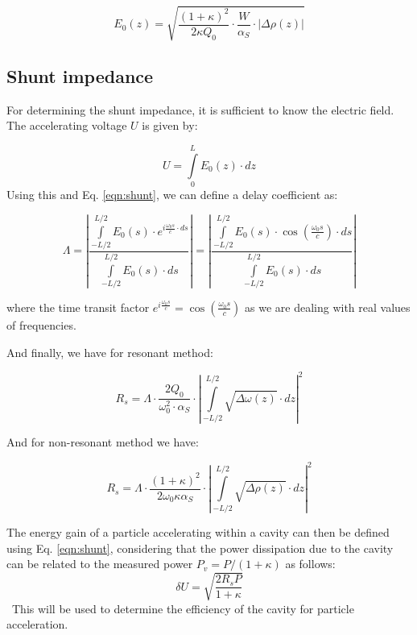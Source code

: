 \documentclass[a4paper]{report}
\numberwithin{equation}{section}
\begin{document}
\begin{equation} \label{eqn:E0_nonres}
		E_{0}(z) = \sqrt{\frac{(1 + \kappa)^2}{2 \kappa Q_{0}}\cdot \frac{W}{\alpha_{S}}\cdot \left| \Delta \rho(z) \right| }
\end{equation}

\subsection{Shunt impedance}
For determining the shunt impedance, it is sufficient to know the electric field. The accelerating voltage $U$ is given by: 

\[ 
		U = \int\limits_{0}^{L} E_{0}(z) \cdot dz
\]
Using this and Eq. \ref{eqn:shunt}, we can define a delay coefficient as: 

\begin{equation}
		\Lambda = \left| \frac{\int\limits_{-L/2}^{L/2} E_{0}(s) \cdot e^{i \frac{\omega_{0}s}{c}\cdot ds}}{\int\limits_{-L/2}^{L/2} E_{0}(s) \cdot ds} \right| = 
		\left| \frac{\int\limits_{-L/2}^{L/2} E_{0}(s) \cdot \cos\left(\frac{\omega_{0}s}{c} \right)\cdot ds }{\int\limits_{-L/2}^{L/2} E_{0}(s) \cdot ds} \right| 
\end{equation}

where the time transit factor $e^{i \frac{\omega_{0}s}{c}} = \cos\left(\frac{\omega_{0}s}{c}\right)$ as we are dealing with real values of frequencies. \par 
And finally, we have for resonant method:

\begin{equation} \label{eqn:Rs_res}
		R_{s} = \Lambda \cdot \frac{2Q_{0}}{\omega_{0}^2 \cdot \alpha_{S}} \cdot \left| \int\limits_{-L/2}^{L/2} \sqrt{\Delta \omega (z)} \cdot dz \right|^2
\end{equation}

And for non-resonant method we have: 

\begin{equation} \label{eqn:Rs_nonres}
		R_{s} = \Lambda \cdot \frac{(1 + \kappa)^2}{2 \omega_{0} \kappa \alpha_{S}} \cdot \left| \int\limits_{-L/2}^{L/2} \sqrt{\Delta \rho (z)} \cdot dz \right|^2
\end{equation}

The energy gain of a particle accelerating within a cavity can then be defined using Eq. \ref{eqn:shunt}, considering that the power dissipation due to the cavity 
can be related to the measured power $P_v = P / (1 + \kappa)$ as follows:
\begin{equation} \label{eqn:energy_gain}
	\delta U = \sqrt{\frac{2 R_s P}{1 + \kappa}}
\end{equation}\
This will be used to determine the efficiency of the cavity for particle acceleration.
\end{document}

